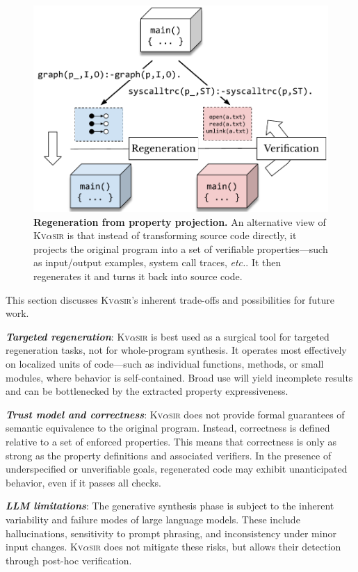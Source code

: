 \documentclass[nonacm,sigplan,review]{acmart}
\def\etc{{\em etc.}\xspace}
\newcommand{\sys}{{\scshape Kv{$\alpha$}sir}\xspace}
\newcommand{\heading}[1]{\vspace{2pt}\noindent\textbf{\emph{#1}}:\enspace}
\begin{document}
\begin{figure}[t]
  \includegraphics[width=.8\columnwidth]{figs/kvasir_projection.pdf}
  \caption{\textbf{Regeneration from property projection.}
  An alternative view of \sys is that instead of transforming source code directly, it projects the original
  program into a set of verifiable properties---such as input/output
  examples, system call traces, \etc.
  It then regenerates it and turns it back into source code.}
  \label{fig:projection}
\end{figure}

This section discusses \sys's inherent trade-offs and possibilities for future work.


\heading{Targeted regeneration}
\sys is best used as a surgical tool for targeted regeneration tasks, not for whole-program synthesis.
It operates most effectively on localized units of code---such as individual functions, methods, or small modules, where behavior is self-contained.
Broad use will yield incomplete results and can be bottlenecked by the extracted property expressiveness.

\heading{Trust model and correctness}
\sys
does not provide formal guarantees
of semantic equivalence
to the original program.
Instead,
correctness is defined relative to a set of enforced properties.
This means that correctness is only as strong as the property definitions and associated verifiers.
In the presence of underspecified or unverifiable goals,
regenerated code
may exhibit unanticipated behavior,
even if it passes all checks.

\heading{LLM limitations}
The generative synthesis phase
is subject to the inherent variability and failure modes
of large language models.
These include hallucinations,
sensitivity to prompt phrasing,
and inconsistency
under minor input changes.
\sys does not mitigate these risks,
but allows their detection
through post-hoc verification.
\end{document}
